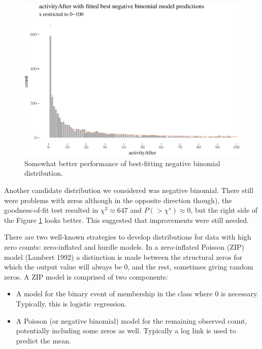 \documentclass[10pt,]{scrartcl}
\begin{document}
\begin{figure}

\begin{center}\includegraphics[width=1\linewidth]{redditAnalysisWalkthrough_files/figure-latex/unnamed-chunk-74-1} \end{center}
\caption{Somewhat better performance of best-fitting negative binomial distribution.}
\label{fig:nbinperf}
\end{figure}

Another candidate distribution we considered was negative binomial.
There still were problems with zeros although in the opposite direction
though), the goodness-of-fit test resulted in \(\chi^2 \approx 647\) and
\(P(>\chi^s)\approx 0\), but the right side of the Figure
\ref{fig:nbinperf} looks better. This suggested that improvements were
still needed.

There are two well-known strategies to develop distributions for data
with high zero counts: zero-inflated and hurdle models. In a
zero-inflated Poisson (ZIP) model (Lambert 1992) a distinction is made
between the structural zeros for which the output value will always be
0, and the rest, sometimes giving random zeros. A ZIP model is comprised
of two components:

\begin{itemize}
\item  A model for the binary event of membership in the class where 0 is necessary. Typically, this is logistic regression. 

\item  A Poisson (or negative binomial) model for the remaining observed count, potentially including some zeros as well. Typically a log link is used to predict the mean.
\end{itemize}
\end{document}

